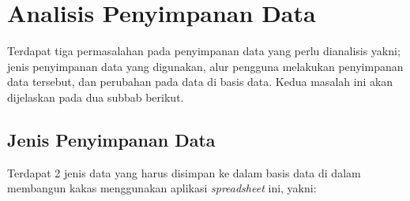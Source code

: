 \section{Analisis Penyimpanan Data}
Terdapat tiga permasalahan pada penyimpanan data yang perlu dianalisis yakni; jenis penyimpanan data yang digunakan, alur pengguna melakukan penyimpanan data tersebut, dan perubahan pada data di basis data. Kedua masalah ini akan dijelaskan pada dua subbab berikut.

	\subsection{Jenis Penyimpanan Data} \label{JenisPenyimpanan}
	Terdapat 2 jenis data yang harus disimpan ke dalam basis data di dalam membangun kakas menggunakan aplikasi \textit{spreadsheet} ini, yakni:

